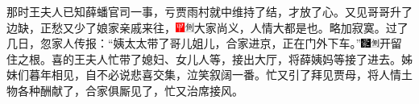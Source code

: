 那时王夫人已知薛蟠官司一事，亏贾雨村就中维持了结，才放了心。又见哥哥升了边缺，正愁又少了娘家亲戚来往，{\includegraphics[width=3mm]{../Images/00002}\includegraphics[width=3mm]{../Images/00011}\footnotesize \kaishu 大家尚义，人情大都是也。}略加寂寞。过了几日，忽家人传报：“姨太太带了哥儿姐儿，合家进京，正在门外下车。”{\includegraphics[width=3mm]{../Images/00006}\includegraphics[width=3mm]{../Images/00011}\footnotesize \kaishu 开留住之根。}喜的王夫人忙带了媳妇、女儿人等，接出大厅，将薛姨妈等接了进去。姊妹们暮年相见，自不必说悲喜交集，泣笑叙阔一番。忙又引了拜见贾母，将人情土物各种酬献了，合家俱厮见了，忙又治席接风。

